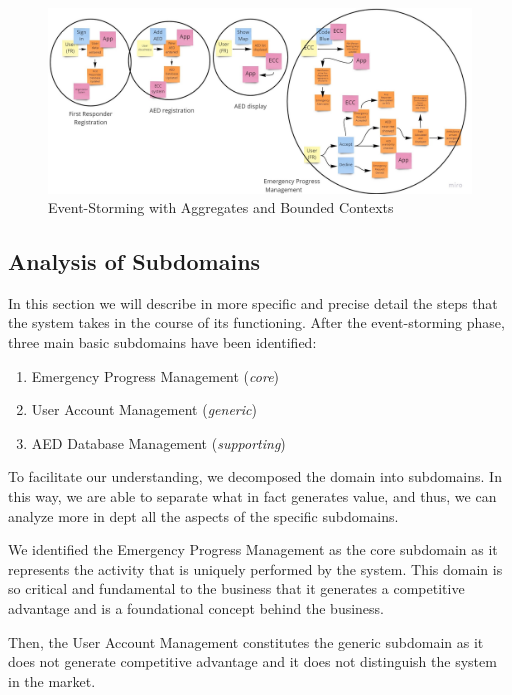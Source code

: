 \documentclass[11pt,a4paper]{article}
\begin{document}
\begin{figure}
    \centering
    \includegraphics[width=\textwidth]{images/event-storming.jpg}
    \caption{Event-Storming with Aggregates and Bounded Contexts}
    \label{fig:event}
\end{figure}

\subsection{Analysis of Subdomains}
In this section we will describe in more specific and precise detail the steps that the system takes in the course of its functioning.
%
After the event-storming phase, three main basic subdomains have been identified:

\begin{enumerate}
    \item Emergency Progress Management (\textit{core})
    \item User Account Management (\textit{generic})
    \item AED Database Management (\textit{supporting})
\end{enumerate}

To facilitate our understanding, we decomposed the domain into subdomains. 
%
In this way, we are able to separate what in fact generates value, and thus, we can analyze more in dept all the aspects of the specific subdomains.

We identified the Emergency Progress Management as the core subdomain as it represents the activity that is uniquely performed by the system.
%
This domain is so critical and fundamental to the business that it generates a competitive advantage and is a foundational concept behind the business.

Then, the User Account Management constitutes the generic subdomain as it does not generate competitive advantage and it does not distinguish the system in the market.
\end{document}
